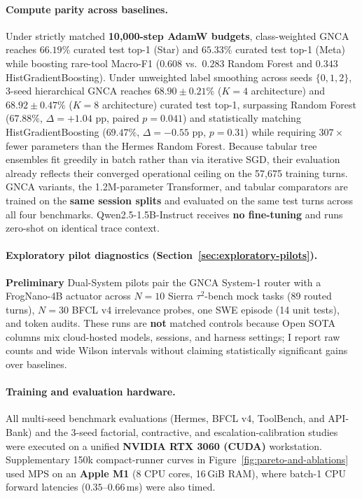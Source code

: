 \documentclass[10pt,twocolumn,letterpaper]{article}
\begin{document}
\paragraph{Compute parity across baselines.}
Under strictly matched \textbf{10{,}000-step AdamW budgets}, class-weighted GNCA reaches $66.19\%$ curated test top-1 (Star) and $65.33\%$ curated test top-1 (Meta) while boosting rare-tool Macro-F1 ($0.608$ vs.\ $0.283$ Random Forest and $0.343$ HistGradientBoosting). Under unweighted label smoothing across seeds $\{0,1,2\}$, 3-seed hierarchical GNCA reaches $68.90 \pm 0.21\%$ ($K=4$ architecture) and $68.92 \pm 0.47\%$ ($K=8$ architecture) curated test top-1, surpassing Random Forest ($67.88\%$, $\Delta = +1.04\text{ pp}$, paired $p = 0.041$) and statistically matching HistGradientBoosting ($69.47\%$, $\Delta = -0.55\text{ pp}$, $p = 0.31$) while requiring $307\times$ fewer parameters than the Hermes Random Forest. Because tabular tree ensembles fit greedily in batch rather than via iterative SGD, their evaluation already reflects their converged operational ceiling on the 57{,}675 training turns. GNCA variants, the 1.2M-parameter Transformer, and tabular comparators are trained on the \textbf{same session splits} and evaluated on the same test turns across all four benchmarks. Qwen2.5-1.5B-Instruct receives \textbf{no fine-tuning} and runs zero-shot on identical trace context.

\paragraph{Exploratory pilot diagnostics (Section~\ref{sec:exploratory-pilots}).}
\textbf{Preliminary} Dual-System pilots pair the GNCA System-1 router with a FrogNano-4B actuator across $N=10$ Sierra $\tau^2$-bench mock tasks (89 routed turns), $N=30$ BFCL v4 irrelevance probes, one SWE episode (14 unit tests), and token audits. These runs are \textbf{not} matched controls because Open SOTA columns mix cloud-hosted models, sessions, and harness settings; I report raw counts and wide Wilson intervals without claiming statistically significant gains over baselines.

\paragraph{Training and evaluation hardware.}
All multi-seed benchmark evaluations (Hermes, BFCL v4, ToolBench, and API-Bank) and the 3-seed factorial, contractive, and escalation-calibration studies were executed on a unified \textbf{NVIDIA RTX 3060 (CUDA)} workstation. Supplementary 150k compact-runner curves in Figure~\ref{fig:pareto-and-ablations} used MPS on an \textbf{Apple M1} (8 CPU cores, 16\,GiB RAM), where batch-1 CPU forward latencies ($0.35$--$0.66$\,ms) were also timed.
\end{document}
